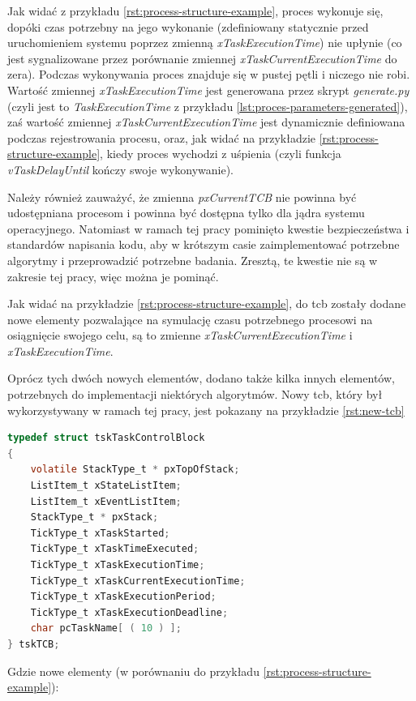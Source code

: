 \documentclass[../../main]{subfiles}
\begin{document}
Jak widać z przykładu \ref{rst:process-structure-example}, proces wykonuje się, dopóki czas potrzebny na jego wykonanie (zdefiniowany statycznie przed uruchomieniem systemu poprzez zmienną \textit{xTaskExecutionTime}) nie upłynie (co jest sygnalizowane przez porównanie zmiennej \textit{xTaskCurrentExecutionTime} do zera). Podczas wykonywania proces znajduje się w pustej pętli i niczego nie robi. Wartość zmiennej \textit{xTaskExecutionTime} jest generowana przez skrypt \textit{generate.py} (czyli jest to \textit{TaskExecutionTime} z przykładu \ref{lst:proces-parameters-generated}), zaś wartość zmiennej \textit{xTaskCurrentExecutionTime} jest dynamicznie definiowana podczas rejestrowania procesu, oraz, jak widać na przykładzie \ref{rst:process-structure-example}, kiedy proces wychodzi z uśpienia (czyli funkcja \textit{vTaskDelayUntil} kończy swoje wykonywanie).

Należy również zauważyć, że zmienna \textit{pxCurrentTCB} nie powinna być udostępniana procesom i powinna być dostępna tylko dla jądra systemu operacyjnego. Natomiast w ramach tej pracy pominięto kwestie bezpieczeństwa i standardów napisania kodu, aby w krótszym casie zaimplementować potrzebne algorytmy i przeprowadzić potrzebne badania. Zresztą, te kwestie nie są w zakresie tej pracy, więc można je pominąć.

Jak widać na przykładzie \ref{rst:process-structure-example}, do \gls{tcb} zostały dodane nowe elementy pozwalające na symulację czasu potrzebnego procesowi na osiągnięcie swojego celu, są to zmienne \textit{xTaskCurrentExecutionTime} i \textit{xTaskExecutionTime}.

Oprócz tych dwóch nowych elementów, dodano także kilka innych elementów, potrzebnych do implementacji niektórych algorytmów. Nowy \gls{tcb}, który był wykorzystywany w ramach tej pracy, jest pokazany na przykładzie \ref{rst:new-tcb}

\begin{lstlisting}[language=C, label={rst:new-tcb}, caption={Zmodyfikowany \gls{tcb}}]
typedef struct tskTaskControlBlock
{
    volatile StackType_t * pxTopOfStack;
    ListItem_t xStateListItem;
    ListItem_t xEventListItem;
    StackType_t * pxStack;
    TickType_t xTaskStarted;
    TickType_t xTaskTimeExecuted;
    TickType_t xTaskExecutionTime;
    TickType_t xTaskCurrentExecutionTime;
    TickType_t xTaskExecutionPeriod;
    TickType_t xTaskExecutionDeadline;
    char pcTaskName[ ( 10 ) ];
} tskTCB;
\end{lstlisting}

Gdzie nowe elementy (w porównaniu do przykładu \ref{rst:process-structure-example}):
\end{document}
